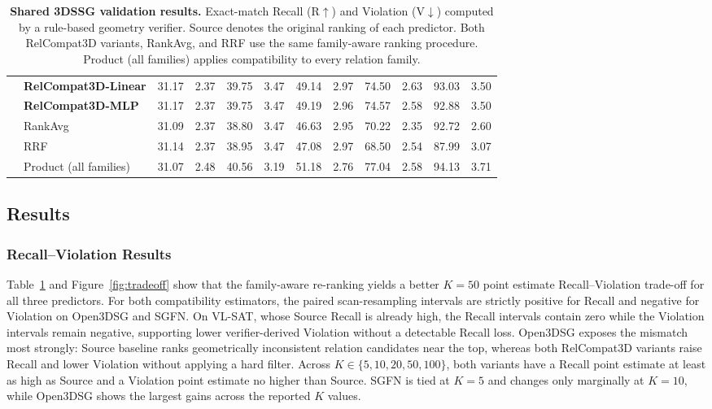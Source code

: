 \begin{table}[!t]
{\begin{tabular}{@{}llrrrrrrrrrr@{}}
    & \textbf{RelCompat3D-Linear} & 31.17 & 2.37 & 39.75 & 3.47 & 49.14 & 2.97 & 74.50 & 2.63 & 93.03 & 3.50 \\
    & \textbf{RelCompat3D-MLP} & 31.17 & 2.37 & 39.75 & 3.47 & 49.19 & 2.96 & 74.57 & 2.58 & 92.88 & 3.50 \\
    & RankAvg & 31.09 & 2.37 & 38.80 & 3.47 & 46.63 & 2.95 & 70.22 & 2.35 & 92.72 & 2.60 \\
    & RRF & 31.14 & 2.37 & 38.95 & 3.47 & 47.08 & 2.97 & 68.50 & 2.54 & 87.99 & 3.07 \\
    & Product (all families) & 31.07 & 2.48 & 40.56 & 3.19 & 51.18 & 2.76 & 77.04 & 2.58 & 94.13 & 3.71 \\
    \bottomrule
    \end{tabular}
    }
    \caption{\textbf{Shared 3DSSG validation results.} Exact-match Recall (R$\uparrow$) and Violation (V$\downarrow$) computed by a rule-based geometry verifier. Source denotes the original ranking of each predictor. Both RelCompat3D variants, RankAvg, and RRF use the same family-aware ranking procedure. Product (all families) applies compatibility to every relation family.}
    \label{tab:main-results}
\end{table}

\subsection{Results}
\subsubsection{Recall–Violation Results}
Table~\ref{tab:main-results} and Figure~\ref{fig:tradeoff} show that the family-aware re-ranking yields a better $K=50$ point estimate Recall--Violation trade-off for all three predictors. For both compatibility estimators, the paired scan-resampling intervals are strictly positive for Recall and negative for Violation on Open3DSG and SGFN. On VL-SAT, whose Source Recall is already high, the Recall intervals contain zero while the Violation intervals remain negative, supporting lower verifier-derived Violation without a detectable Recall loss. Open3DSG exposes the mismatch most strongly: Source baseline ranks geometrically inconsistent relation candidates near the top, whereas both RelCompat3D variants raise Recall and lower Violation without applying a hard filter. Across $K\in\{5,10,20,50,100\}$, both variants have a Recall point estimate at least as high as Source and a Violation point estimate no higher than Source. SGFN is tied at $K=5$ and changes only marginally at $K=10$, while Open3DSG shows the largest gains across the reported $K$ values. 

